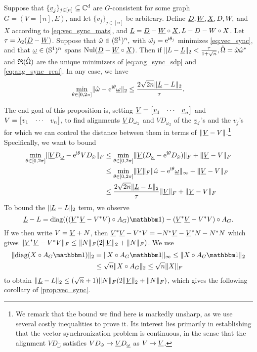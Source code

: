 \begin{proposition} \label{prop:vec_sync}
  Suppose that $\{\underline{v}_j\}_{j \in [n]} \subseteq \mathbb{C}^d$ are $G$-consistent for some graph $G = (V = [n], E)$, and let $\{v_j\}_{j \in [n]}$ be arbitrary.  Define $\underline{D}, \underline{W}, \underline{X}, D, W,$ and $X$ according to \eqref{eq:vec_sync_mats}, and $\underline{L} = \underline{D} - \underline{W} \circ \underline{X}, L - D - W \circ X$.  Let $\tau = \lambda_2(\underline{D} - \underline{W})$.  Suppose that $\hat{\omega} \in (\mathbb{S}^1)^n,$ with $\hat{\omega_j} = \mathrm{e}^{\mathrm{i} \theta_{j}}$ minimizes \eqref{eq:vec_sync}, and that $\underline{\omega} \in (\mathbb{S}^1)^n$ spans $\operatorname{Nul}(\underline{D} - \underline{W} \circ \underline{X})$.  Then if $\lVert L - \underline{L}\rVert_2 < \frac{\tau}{1 + \sqrt{n}}, \hat{\Omega} = \hat{\omega} \hat{\omega}^*$ and $\mathfrak{R}(\hat{\Omega})$ are the unique minimizers of  \eqref{eq:ang_sync_sdp} and \eqref{eq:ang_sync_real}.  In any case, we have \[\min_{\theta \in [0, 2\pi]} \lVert\hat{\omega} - \mathrm{e}^{\mathrm{i} \theta} \underline{\omega}\rVert_2 \le \dfrac{2 \sqrt{2 n} \lVert\underline{L} - L\rVert_2}{\tau}.\]
\end{proposition}
The end goal of this proposition is, setting $\underline{V} = \begin{bmatrix} \underline{v}_{1} & \cdots & \underline{v}_{n} \end{bmatrix}$ and $V = \begin{bmatrix} v_{1} & \cdots & v_{n} \end{bmatrix}$, to find alignments $\underline{V} D_{\omega_1}$ and $V D_{\omega_2}$ of the $\underline{v}_j$'s and the $v_j$'s for which we can control the distance between them in terms of $\lVert\underline{V} - V\rVert$.\footnote{We remark that the bound we find here is markedly unsharp, as we use several costly inequalities to prove it.  Its interest lies primarily in establishing that the vector synchronization problem is continuous, in the sense that the alignment $V D_{\hat{\omega}}$ satisfies $V D_{\hat{\omega}} \to \underline{V} D_{\underline{\omega}}$ as $V \to \underline{V}$.}  Specifically, we want to bound
\begin{align*}
  \min_{\theta \in [0, 2\pi]} \lVert\underline{V} D_{\underline{\omega}} - \mathrm{e}^{\mathrm{i} \theta} V D_{\hat{\omega}}\rVert_F &\le \min_{\theta \in [0, 2\pi]} \lVert\underline{V} (D_{\underline{\omega}} - \mathrm{e}^{\mathrm{i} \theta} D_{\hat{\omega}})\rVert_F + \lVert\underline{V} - V\rVert_F \\
  &\le \min_{\theta \in [0, 2\pi]} \lVert\underline{V}\rVert_F \lVert\hat{\omega} - \mathrm{e}^{\mathrm{i} \theta} \underline{\omega}\rVert_\infty + \lVert\underline{V} - V\rVert_F \\
  &\le \dfrac{2 \sqrt{2 n} \lVert\underline{L} - L\rVert_2}{\tau} \lVert\underline{V}\rVert_F + \lVert\underline{V} - V\rVert_F
\end{align*}
To bound the $\lVert\underline{L} - L\rVert_2$ term, we observe \[\uL - L = \diag(((\uV^* \uV - V^* V) \circ A_G) \one) - (\uV^* \uV - V^* V) \circ A_G.\]  If we then write $V = \underline{V} + N$, then $\underline{V}^* \underline{V} - V^* V = - N^* \underline{V} - \underline{V}^* N - N^*N$ which gives $\lVert\underline{V}^* \underline{V} - V^* V\rVert_F \le \lVert N\rVert_F(2 \lVert\underline{V}\rVert_2 + \lVert N\rVert_F)$.  We use \[\begin{aligned}\norm{\diag(X \circ A_G \one)}_2 &= \norm{X \circ A_G \one}_\infty \le \norm{X \circ A_G \one}_2 \\ &\le \sqrt{n} \norm{X \circ A_G}_2 \le \sqrt{n} \norm{X}_F\end{aligned}\] to obtain $\lVert\underline{L} - L\rVert_2 \le (\sqrt{n} + 1) \lVert N\rVert_F(2 \lVert\underline{V}\rVert_2 + \lVert N\rVert_F)$, which gives the following corollary of \cref{prop:vec_sync}.

